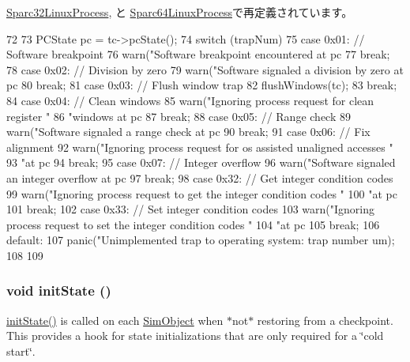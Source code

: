 \hyperlink{classSparcISA_1_1Sparc32LinuxProcess_a7737d67ba76be0bd3beb0bd0dc93333a}{Sparc32LinuxProcess}, と \hyperlink{classSparcISA_1_1Sparc64LinuxProcess_a7737d67ba76be0bd3beb0bd0dc93333a}{Sparc64LinuxProcess}で再定義されています。


\begin{DoxyCode}
72 {
73     PCState pc = tc->pcState();
74     switch (trapNum) {
75       case 0x01: // Software breakpoint
76         warn("Software breakpoint encountered at pc %
77         break;
78       case 0x02: // Division by zero
79         warn("Software signaled a division by zero at pc %
80         break;
81       case 0x03: // Flush window trap
82         flushWindows(tc);
83         break;
84       case 0x04: // Clean windows
85         warn("Ignoring process request for clean register "
86                 "windows at pc %
87         break;
88       case 0x05: // Range check
89         warn("Software signaled a range check at pc %
90         break;
91       case 0x06: // Fix alignment
92         warn("Ignoring process request for os assisted unaligned accesses "
93                 "at pc %
94         break;
95       case 0x07: // Integer overflow
96         warn("Software signaled an integer overflow at pc %
97         break;
98       case 0x32: // Get integer condition codes
99         warn("Ignoring process request to get the integer condition codes "
100                 "at pc %
101         break;
102       case 0x33: // Set integer condition codes
103         warn("Ignoring process request to set the integer condition codes "
104                 "at pc %
105         break;
106       default:
107         panic("Unimplemented trap to operating system: trap number %
      um);
108     }
109 }
\end{DoxyCode}
\hypertarget{classSparcLiveProcess_a3c34ea9b29f410748d4435a667484924}{
\subsubsection[{initState}]{\setlength{\rightskip}{0pt plus 5cm}void initState ()}}
\label{classSparcLiveProcess_a3c34ea9b29f410748d4435a667484924}
\hyperlink{classSparcLiveProcess_a3c34ea9b29f410748d4435a667484924}{initState()} is called on each \hyperlink{classSimObject}{SimObject} when $\ast$not$\ast$ restoring from a checkpoint. This provides a hook for state initializations that are only required for a \char`\"{}cold start\char`\"{}. 

